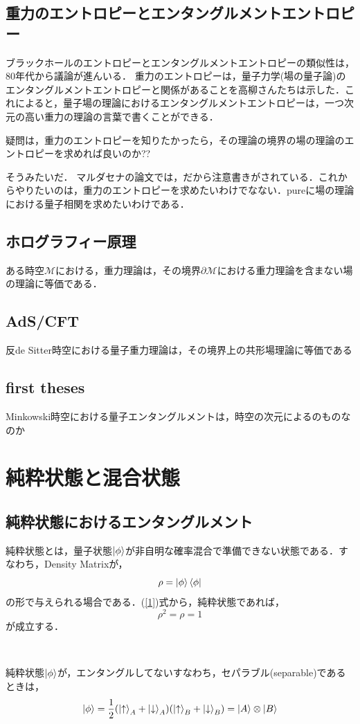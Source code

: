 \subsection{重力のエントロピーとエンタングルメントエントロピー}
ブラックホールのエントロピーとエンタングルメントエントロピーの類似性は，80年代から議論が進んいる．
重力のエントロピーは，量子力学(場の量子論)のエンタングルメントエントロピーと関係があることを高柳さんたちは示した．これによると，量子場の理論におけるエンタングルメントエントロピーは，一つ次元の高い重力の理論の言葉で書くことができる．


疑問は，重力のエントロピーを知りたかったら，その理論の境界の場の理論のエントロピーを求めれば良いのか??

そうみたいだ．
マルダセナの論文では，だから注意書きがされている．これからやりたいのは，重力のエントロピーを求めたいわけでなない．pureに場の理論における量子相関を求めたいわけである．


\subsection{ホログラフィー原理}
ある時空$\mathcal{M}$における，重力理論は，その境界$\mathcal{\partial M}$における重力理論を含まない場の理論に等価である．
\subsection{AdS/CFT}
反de Sitter時空における量子重力理論は，その境界上の共形場理論に等価である
\subsection{first theses}
Minkowski時空における量子エンタングルメントは，時空の次元によるのものなのか
\section{純粋状態と混合状態}
\subsection{純粋状態におけるエンタングルメント}
純粋状態とは，量子状態$\ket{\phi}$が非自明な確率混合で準備できない状態である．すなわち，Density Matrixが，
\begin{equation}
\label{1}
\rho=\ket{\phi}\bra{\phi}
\end{equation}
の形で与えられる場合である．(\ref{1})式から，純粋状態であれば，
\begin{equation}
\rho^{2}=\rho=1
\end{equation}
が成立する．
\begin{empheqboxed}
  \
  \

  純粋状態$\ket{\phi}$が，エンタングルしてないすなわち，セパラブル(separable)であるときは，
  \begin{equation}
    \label{3}
  \ket{\phi}=\frac{1}{2}(\ket{\uparrow}_{A}+\ket{\downarrow}_{A})(\ket{\uparrow}_{B} +\ket{\downarrow}_{B})=\ket{A}\otimes\ket{B}
  \end{equation}

\end{empheqboxed}

